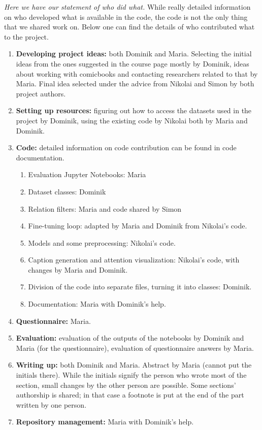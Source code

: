 \documentclass[11pt]{article}
\begin{document}
\textit{Here we have our statement of who did what.}
While really detailed information on who developed what is available in the code, the code is not the only thing that we shared work on. Below one can find the details of who contributed what to the project.
\begin{enumerate}
    \item \textbf{Developing project ideas:} both Dominik and Maria. Selecting the initial ideas from the ones suggested in the course page mostly by Dominik, ideas about working with comicbooks and contacting researchers related to that by Maria. Final idea selected under the advice from Nikolai and Simon by both project authors. 
    \item \textbf{Setting up resources:} figuring out how to access the datasets used in the project by Dominik, using the existing code by Nikolai both by Maria and Dominik.
    \item \textbf{Code:} detailed information on code contribution can be found in code documentation. 
    \begin{enumerate}
        \item Evaluation Jupyter Notebooks: Maria
        \item Dataset classes: Dominik
        \item Relation filters: Maria and code shared by Simon
        \item Fine-tuning loop: adapted by Maria and Dominik from Nikolai's code.
        \item Models and some preprocessing: Nikolai's code.
        \item Caption generation and attention visualization: Nikolai's code, with changes by Maria and Dominik.
        \item Division of the code into separate files, turning it into classes: Dominik.
        \item Documentation: Maria with Dominik's help.
    \end{enumerate}
    \item \textbf{Questionnaire:} Maria.
    \item \textbf{Evaluation:} evaluation of the outputs of the notebooks by Dominik and Maria (for the questionnaire), evaluation of questionnaire answers by Maria.
    \item \textbf{Writing up:} both Dominik and Maria. Abstract by Maria (cannot put the initials there). While the initials signify the person who wrote most of the section, small changes by the other person are possible. Some sections' authorship is shared; in that case a footnote is put at the end of the part written by one person.
    \item \textbf{Repository management:} Maria with Dominik's help.
\end{enumerate}
\end{document}

